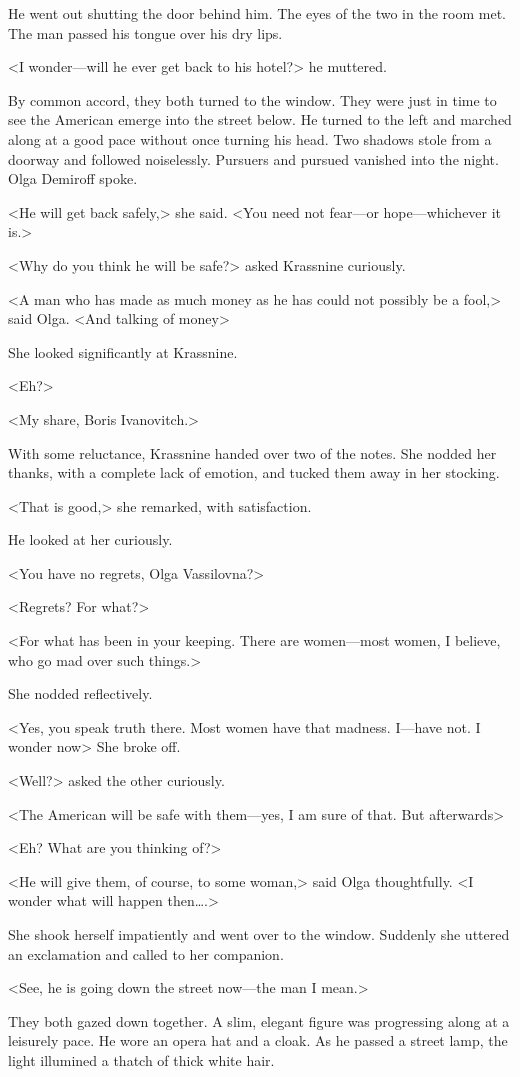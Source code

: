 He went out shutting the door behind him. The eyes of the two in the room met. The man passed his tongue over his dry lips.

<I wonder—will he ever get back to his hotel?> he muttered.

By common accord, they both turned to the window. They were just in time to see the American emerge into the street below. He turned to the left and marched along at a good pace without once turning his head. Two shadows stole from a doorway and followed noiselessly. Pursuers and pursued vanished into the night. Olga Demiroff spoke.

<He will get back safely,> she said. <You need not fear—or hope—whichever it is.>

<Why do you think he will be safe?> asked Krassnine curiously.

<A man who has made as much money as he has could not possibly be a fool,> said Olga. <And talking of money\longdash>

She looked significantly at Krassnine.

<Eh?>

<My share, Boris Ivanovitch.>

With some reluctance, Krassnine handed over two of the notes. She nodded her thanks, with a complete lack of emotion, and tucked them away in her stocking.

<That is good,> she remarked, with satisfaction.

He looked at her curiously.

<You have no regrets, Olga Vassilovna?>

<Regrets? For what?>

<For what has been in your keeping. There are women—most women, I believe, who go mad over such things.>

She nodded reflectively.

<Yes, you speak truth there. Most women have that madness. I—have not. I wonder now\longdash> She broke off.

<Well?> asked the other curiously.

<The American will be safe with them—yes, I am sure of that. But afterwards\longdash>

<Eh? What are you thinking of?>

<He will give them, of course, to some woman,> said Olga thoughtfully. <I wonder what will happen then\dots.>

She shook herself impatiently and went over to the window. Suddenly she uttered an exclamation and called to her companion.

<See, he is going down the street now—the man I mean.>

They both gazed down together. A slim, elegant figure was progressing along at a leisurely pace. He wore an opera hat and a cloak. As he passed a street lamp, the light illumined a thatch of thick white hair.